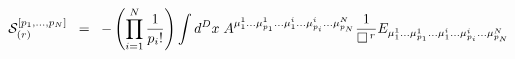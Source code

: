 \begin{equation}
{\cal{S}}_{(r)}^{[ p_1 ,..., p_N ]} \;\; =\;\; - \left( \prod_{i=1}^{N}
\frac{1}{p_i !}
\right) \int d^D x \; A^{{\mu}^1_1 ...{\mu}^1_{p_1} ...{\mu}^i_1
...{\mu}^i_{p_i}
...{\mu}^N_{p_N} } {1 \over {\square}^{\, r}} E_{{\mu}^1_1
...{\mu}^1_{p_1} ...{\mu}^i_1
...{\mu}^i_{p_i} ...{\mu}^N_{p_N}}
\label{eq:1.1}
\end{equation}

